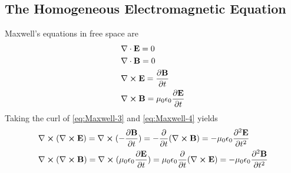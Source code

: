 \subsection{The Homogeneous Electromagnetic Equation}
Maxwell's equations in free space are
\begin{subequations}
    \label{eq:optim}
    \begin{align}
        &\nabla\cdot  \mathbf{E} = 0 \label{eq:Maxwell-1} \\
        &\nabla\cdot  \mathbf{B} = 0 \label{eq:Maxwell-2}\\
        &\nabla\cross \mathbf{E} = \frac{\partial\mathbf{B}}{\partial t} \label{eq:Maxwell-3}\\
        &\nabla\cross \mathbf{B} = \mu_0 \epsilon_0 \frac{\partial\mathbf{E}}{\partial t} \label{eq:Maxwell-4}
    \end{align}
\end{subequations}
Taking the curl of \ref{eq:Maxwell-3} and \ref{eq:Maxwell-4} yields
\begin{subequations} 
\label{eq:curl-}
    \begin{align}
        &\nabla \cross { (\nabla \cross {\mathbf{E}})} 
        = \nabla \cross { (-\frac{\partial \mathbf{B}}{\partial t})} 
        = -\frac{\partial}{\partial t} (\nabla \cross {\mathbf{B}})
        = - \mu_0 \epsilon_0 \frac{\partial^2 \mathbf{E}}{\partial t^2} 
        \label{eq:curl-E}\\
        &\nabla \cross { (\nabla \cross {\mathbf{B}})} 
        = \nabla \cross { (\mu_0 \epsilon_0 \frac{\partial \mathbf{E}}{\partial t})} 
        = \mu_0 \epsilon_0\frac{\partial}{\partial t} (\nabla \cross \mathbf{E}) 
        = - \mu_0 \epsilon_0 \frac{\partial^2 \mathbf{B}}{\partial t^2} 
        \label{eq:curl-B}
    \end{align}
\end{subequations}
   
